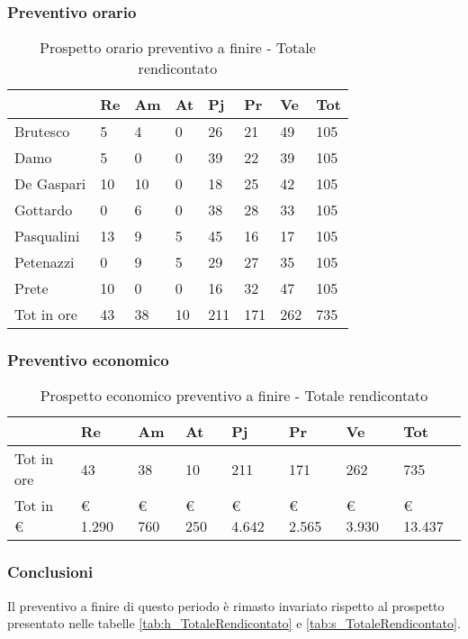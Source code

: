 		\subsubsection{Preventivo orario}
			\begin{table}[H] \begin{center} \begin{tabular}{llllllll}
									\toprule
										&	\textbf{Re}	&	\textbf{Am}	&	\textbf{At}	&	\textbf{Pj}	&	\textbf{Pr}	&	\textbf{Ve}	&	\textbf{Tot}	 \\
									\midrule
										Brutesco	&	5	&	4	&	0	&	26	&	21	&	49	&	105	 \\
										Damo	&	5	&	0	&	0	&	39	&	22	&	39	&	105	 \\
										De Gaspari	&	10	&	10	&	0	&	18	&	25	&	42	&	105	 \\
										Gottardo	&	0	&	6	&	0	&	38	&	28	&	33	&	105	 \\
										Pasqualini	&	13	&	9	&	5	&	45	&	16	&	17	&	105	 \\
										Petenazzi	&	0	&	9	&	5	&	29	&	27	&	35	&	105	 \\
										Prete	&	10	&	0	&	0	&	16	&	32	&	47	&	105	 \\
										\midrule
										Tot in ore	&	43	&	38	&	10	&	211	&	171	&	262	&	735	 \\
								

									\bottomrule
									\end{tabular} \end{center} \caption{Prospetto orario preventivo a finire -
									Totale rendicontato
									}\end{table}
		\subsubsection{Preventivo economico}
									\begin{table}[H] \begin{center} \begin{tabular}{llllllll}
									\toprule
										&	\textbf{Re}	&	\textbf{Am}	&	\textbf{At}	&	\textbf{Pj}	&	\textbf{Pr}	&	\textbf{Ve}	&	\textbf{Tot}	 \\

									\midrule
									Tot in ore	&	43	&	38	&	10	&	211	&	171	&	262	&	735	 \\
		
		
									Tot in €	&	 €  1.290 	 & 	 €      760 	 & 	 €     250 	 & 	 €  4.642 	 & 	 € 2.565 	 & 	 €  3.930 	 & 	 €  13.437 	 \\
									\bottomrule
									\end{tabular} \end{center} \caption{Prospetto economico preventivo a finire				 -
									Totale rendicontato
									}\end{table}

		\subsubsection{Conclusioni} Il preventivo a finire di questo periodo è rimasto invariato rispetto al prospetto presentato nelle tabelle \ref{tab:h_TotaleRendicontato} e \ref{tab:s_TotaleRendicontato}.
